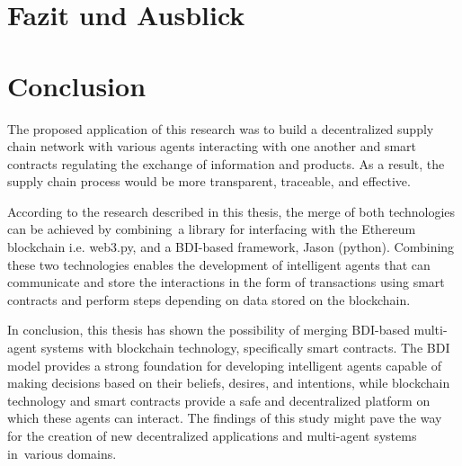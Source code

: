 {\chapter{Fazit und Ausblick}}
{\chapter{Conclusion}}

\label{sec:conclusion}

The proposed application of this research was to build a decentralized supply chain network with various agents interacting with one another and smart contracts regulating the exchange of information and products. As a result, the supply chain process would be more transparent, traceable, and effective. 

\vspace{.5cm}

According to the research described in this thesis, the merge of both technologies can be achieved by combining a library for interfacing with the Ethereum blockchain i.e. web3.py, and a \ac{BDI}-based framework, Jason (python). Combining these two technologies enables the development of intelligent agents that can communicate and store the interactions in the form of transactions using smart contracts and perform steps depending on data stored on the blockchain.

\vspace{.5cm}

In conclusion, this thesis has shown the possibility of merging \ac{BDI}-based multi-agent systems with blockchain technology, specifically smart contracts. The \ac{BDI} model provides a strong foundation for developing intelligent agents capable of making decisions based on their beliefs, desires, and intentions, while blockchain technology and smart contracts provide a safe and decentralized platform on which these agents can interact. The findings of this study might pave the way for the creation of new decentralized applications and multi-agent systems in various domains.


